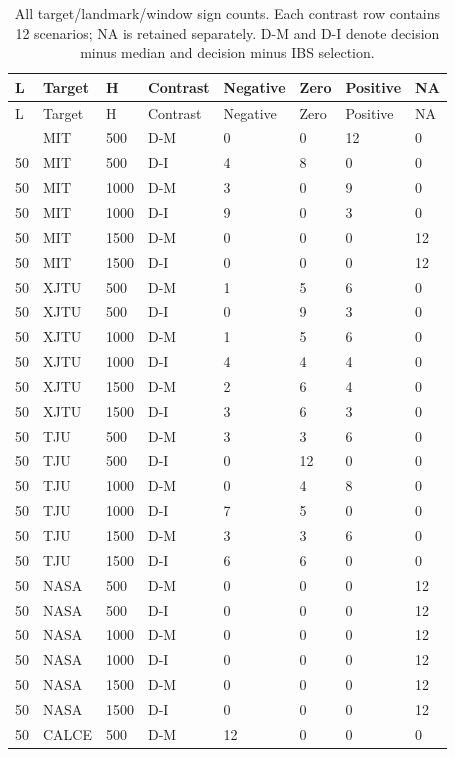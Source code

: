 \documentclass[10pt,a4paper]{article}
\begin{document}
{\scriptsize
\begin{longtable}{@{\extracolsep{\fill}}llllllll}
\caption{All target/landmark/window sign counts. Each contrast row contains 12 scenarios; NA is retained separately. D-M and D-I denote decision minus median and decision minus IBS selection.}\label{tab:scenario_summary}\\
\toprule
L & Target & H & Contrast & Negative & Zero & Positive & NA\\\midrule
\endfirsthead
\toprule
L & Target & H & Contrast & Negative & Zero & Positive & NA\\\midrule
\endhead
\bottomrule\endfoot
50 & MIT & 500 & D-M & 0 & 0 & 12 & 0\\
50 & MIT & 500 & D-I & 4 & 8 & 0 & 0\\
50 & MIT & 1000 & D-M & 3 & 0 & 9 & 0\\
50 & MIT & 1000 & D-I & 9 & 0 & 3 & 0\\
50 & MIT & 1500 & D-M & 0 & 0 & 0 & 12\\
50 & MIT & 1500 & D-I & 0 & 0 & 0 & 12\\
50 & XJTU & 500 & D-M & 1 & 5 & 6 & 0\\
50 & XJTU & 500 & D-I & 0 & 9 & 3 & 0\\
50 & XJTU & 1000 & D-M & 1 & 5 & 6 & 0\\
50 & XJTU & 1000 & D-I & 4 & 4 & 4 & 0\\
50 & XJTU & 1500 & D-M & 2 & 6 & 4 & 0\\
50 & XJTU & 1500 & D-I & 3 & 6 & 3 & 0\\
50 & TJU & 500 & D-M & 3 & 3 & 6 & 0\\
50 & TJU & 500 & D-I & 0 & 12 & 0 & 0\\
50 & TJU & 1000 & D-M & 0 & 4 & 8 & 0\\
50 & TJU & 1000 & D-I & 7 & 5 & 0 & 0\\
50 & TJU & 1500 & D-M & 3 & 3 & 6 & 0\\
50 & TJU & 1500 & D-I & 6 & 6 & 0 & 0\\
50 & NASA & 500 & D-M & 0 & 0 & 0 & 12\\
50 & NASA & 500 & D-I & 0 & 0 & 0 & 12\\
50 & NASA & 1000 & D-M & 0 & 0 & 0 & 12\\
50 & NASA & 1000 & D-I & 0 & 0 & 0 & 12\\
50 & NASA & 1500 & D-M & 0 & 0 & 0 & 12\\
50 & NASA & 1500 & D-I & 0 & 0 & 0 & 12\\
50 & CALCE & 500 & D-M & 12 & 0 & 0 & 0\\

\end{longtable}}
\end{document}
